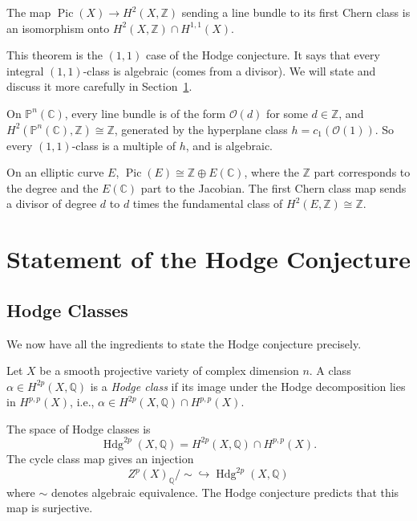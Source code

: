 \begin{theorem}[Lefschetz, 1924]
The map $\operatorname{Pic}(X) \to H^2(X, \mathbb{Z})$ sending a line bundle to its first Chern class is an isomorphism onto $H^2(X, \mathbb{Z}) \cap H^{1,1}(X)$.
\end{theorem}

This theorem is the $(1,1)$ case of the Hodge conjecture. It says that every integral $(1,1)$-class is algebraic (comes from a divisor). We will state and discuss it more carefully in Section~\ref{sec:statement}.

\begin{example}
On $\mathbb{P}^n(\mathbb{C})$, every line bundle is of the form $\mathcal{O}(d)$ for some $d \in \mathbb{Z}$, and $H^2(\mathbb{P}^n(\mathbb{C}), \mathbb{Z}) \cong \mathbb{Z}$, generated by the hyperplane class $h = c_1(\mathcal{O}(1))$. So every $(1,1)$-class is a multiple of $h$, and is algebraic.
\end{example}

\begin{example}
On an elliptic curve $E$, $\operatorname{Pic}(E) \cong \mathbb{Z} \oplus E(\mathbb{C})$, where the $\mathbb{Z}$ part corresponds to the degree and the $E(\mathbb{C})$ part to the Jacobian. The first Chern class map sends a divisor of degree $d$ to $d$ times the fundamental class of $H^2(E, \mathbb{Z}) \cong \mathbb{Z}$.
\end{example}

\section{Statement of the Hodge Conjecture}
\label{sec:statement}

\subsection{Hodge Classes}

We now have all the ingredients to state the Hodge conjecture precisely.

\begin{definition}
Let $X$ be a smooth projective variety of complex dimension $n$. A class $\alpha \in H^{2p}(X, \mathbb{Q})$ is a \emph{Hodge class} if its image under the Hodge decomposition lies in $H^{p,p}(X)$, i.e., $\alpha \in H^{2p}(X, \mathbb{Q}) \cap H^{p,p}(X)$.
\end{definition}

The space of Hodge classes is
\[
\operatorname{Hdg}^{2p}(X, \mathbb{Q}) = H^{2p}(X, \mathbb{Q}) \cap H^{p,p}(X).
\]
The cycle class map gives an injection
\[
Z^p(X)_{\mathbb{Q}} / \sim \hookrightarrow \operatorname{Hdg}^{2p}(X, \mathbb{Q})
\]
where $\sim$ denotes algebraic equivalence. The Hodge conjecture predicts that this map is surjective.

